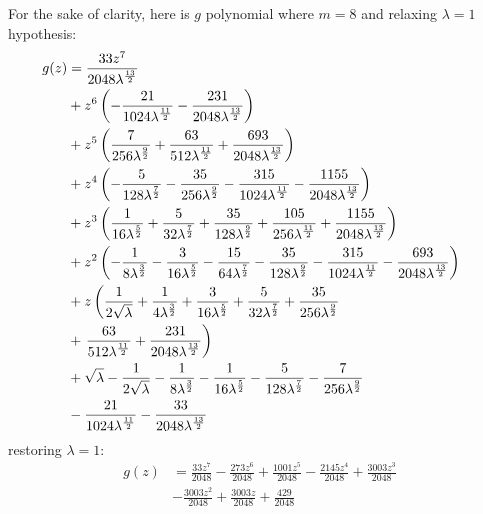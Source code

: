 For the sake of clarity, here is $g$ polynomial where $m=8$ and relaxing $\lambda=1$ hypothesis:
\begin{displaymath}
\hspace{-0.5cm}
\begin{split}
g{\left (z \right )} &= \frac{33 z^{7}}{2048 \lambda^{\frac{13}{2}}} \\
&+ z^{6} \left(- \frac{21}{1024 \lambda^{\frac{11}{2}}} - \frac{231}{2048 \lambda^{\frac{13}{2}}}\right) \\
&+ z^{5} \left(\frac{7}{256 \lambda^{\frac{9}{2}}} + \frac{63}{512 \lambda^{\frac{11}{2}}} + \frac{693}{2048 \lambda^{\frac{13}{2}}}\right) \\
&+ z^{4} \left(- \frac{5}{128 \lambda^{\frac{7}{2}}} - \frac{35}{256 \lambda^{\frac{9}{2}}} - \frac{315}{1024 \lambda^{\frac{11}{2}}} - \frac{1155}{2048 \lambda^{\frac{13}{2}}}\right) \\
&+ z^{3} \left(\frac{1}{16 \lambda^{\frac{5}{2}}} + \frac{5}{32 \lambda^{\frac{7}{2}}} + \frac{35}{128 \lambda^{\frac{9}{2}}} + \frac{105}{256 \lambda^{\frac{11}{2}}} + \frac{1155}{2048 \lambda^{\frac{13}{2}}}\right) \\
&+ z^{2} \left(- \frac{1}{8 \lambda^{\frac{3}{2}}} - \frac{3}{16 \lambda^{\frac{5}{2}}} - \frac{15}{64 \lambda^{\frac{7}{2}}} - \frac{35}{128 \lambda^{\frac{9}{2}}} - \frac{315}{1024 \lambda^{\frac{11}{2}}} - \frac{693}{2048 \lambda^{\frac{13}{2}}}\right) \\
&+ z \left(\frac{1}{2 \sqrt{\lambda}} + \frac{1}{4 \lambda^{\frac{3}{2}}} + \frac{3}{16 \lambda^{\frac{5}{2}}} + \frac{5}{32 \lambda^{\frac{7}{2}}} + \frac{35}{256 \lambda^{\frac{9}{2}}} \right. \\
    &+ \left. \frac{63}{512 \lambda^{\frac{11}{2}}} + \frac{231}{2048 \lambda^{\frac{13}{2}}}\right) \\
&+ \sqrt{\lambda} - \frac{1}{2 \sqrt{\lambda}} - \frac{1}{8 \lambda^{\frac{3}{2}}} - \frac{1}{16 \lambda^{\frac{5}{2}}} - \frac{5}{128 \lambda^{\frac{7}{2}}} - \frac{7}{256 \lambda^{\frac{9}{2}}} \\
&- \frac{21}{1024 \lambda^{\frac{11}{2}}} - \frac{33}{2048 \lambda^{\frac{13}{2}}}
\end{split}
\end{displaymath}
restoring $\lambda=1$:
\begin{displaymath}
\begin{split}
g{\left (z \right )} &= \frac{33 z^{7}}{2048} - \frac{273 z^{6}}{2048} + \frac{1001 z^{5}}{2048} - \frac{2145 z^{4}}{2048} + \frac{3003 z^{3}}{2048} \\
&- \frac{3003 z^{2}}{2048} + \frac{3003 z}{2048} + \frac{429}{2048}
\end{split}
\end{displaymath}

